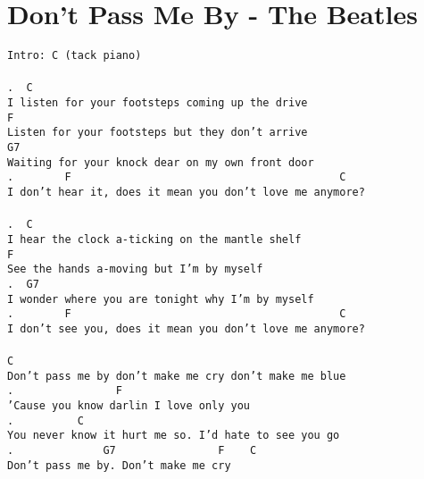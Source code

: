 \newpage
\section{Don't Pass Me By - The Beatles}
\label{Don't Pass Me By - The Beatles}
\texttt{\lbrack Intro\rbrack: C (tack piano)\\
\\
.\ \ C\ \\
I\ listen\ for\ your\ footsteps\ coming\ up\ the\ drive\\
F\\
Listen\ for\ your\ footsteps\ but\ they\ don't\ arrive\\
G7\\
Waiting\ for\ your\ knock\ dear\ on\ my\ own\ front\ door\\
.\ \ \ \ \ \ \ \ F\ \ \ \ \ \ \ \ \ \ \ \ \ \ \ \ \ \ \ \ \ \ \ \ \ \ \ \ \ \ \ \ \ \ \ \ \ \ \ \ \ \ C\\
I\ don't\ hear\ it,\ does\ it\ mean\ you\ don't\ love\ me\ anymore?\\
\\
.\ \ C\ \ \ \ \ \ \ \ \ \ \ \ \ \ \ \ \ \\
I\ hear\ the\ clock\ a-ticking\ on\ the\ mantle\ shelf\ \ \ \ \\
F\ \ \ \ \ \ \ \ \ \ \ \ \ \ \ \ \ \ \ \ \\
See\ the\ hands\ a-moving\ but\ I'm\ by\ myself\ \ \ \ \\
.\ \ G7\\
I\ wonder\ where\ you\ are\ tonight\ why\ I'm\ by\ myself\\
.\ \ \ \ \ \ \ \ F\ \ \ \ \ \ \ \ \ \ \ \ \ \ \ \ \ \ \ \ \ \ \ \ \ \ \ \ \ \ \ \ \ \ \ \ \ \ \ \ \ \ C\\
I\ don't\ see\ you,\ does\ it\ mean\ you\ don't\ love\ me\ anymore?\\
\\
C\\
Don't\ pass\ me\ by\ don't\ make\ me\ cry\ don't\ make\ me\ blue\\
.\ \ \ \ \ \ \ \ \ \ \ \ \ \ \ \ F\\
'Cause\ you\ know\ darlin\ I\ love\ only\ you\\
.\ \ \ \ \ \ \ \ \ \ C\\
You\ never\ know\ it\ hurt\ me\ so.\ I'd\ hate\ to\ see\ you\ go\\
.\ \ \ \ \ \ \ \ \ \ \ \ \ \ G7\ \ \ \ \ \ \ \ \ \ \ \ \ \ \ \ F\ \ \ \ C\\
Don't\ pass\ me\ by.\ Don't\ make\ me\ cry\ \ \ \ \ \ \ \\
}
